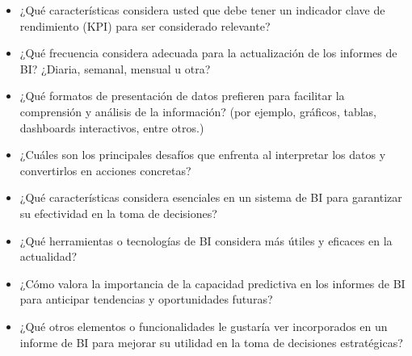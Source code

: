 
\begin{itemize}
    \item ¿Qué características considera usted que debe tener un indicador clave de rendimiento (KPI) para ser considerado relevante?
    \item ¿Qué frecuencia considera adecuada para la actualización de los informes de BI? ¿Diaria, semanal, mensual u otra?
    \item ¿Qué formatos de presentación de datos prefieren para facilitar la comprensión y análisis de la información? (por ejemplo, gráficos, tablas, dashboards interactivos, entre otros.)
    \item ¿Cuáles son los principales desafíos que enfrenta al interpretar los datos y convertirlos en acciones concretas?
    \item ¿Qué características considera esenciales en un sistema de BI para garantizar su efectividad en la toma de decisiones?
    \item ¿Qué herramientas o tecnologías de BI considera más útiles y eficaces en la actualidad?
    \item ¿Cómo valora la importancia de la capacidad predictiva en los informes de BI para anticipar tendencias y oportunidades futuras?
    \item ¿Qué otros elementos o funcionalidades le gustaría ver incorporados en un informe de BI para mejorar su utilidad en la toma de decisiones estratégicas?
\end{itemize}